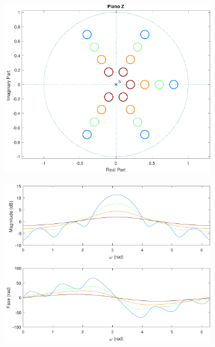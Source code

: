 \documentclass[a4paper,11pt]{article}
\numberwithin{figure}{section}
\numberwithin{equation}{section}
\numberwithin{table}{section}
\theoremstyle{definition}
\begin{document}
\begin{figure}[ht]
\begin{subfigure}{0.44\textwidth}
		\includegraphics[width=\textwidth]{ex_3_pz_6}
	\end{subfigure}
	\begin{subfigure}{0.44\textwidth}
		\includegraphics[width=\textwidth]{ex_3_bode_6}
	\end{subfigure}\\
	\begin{subfigure}{0.44\textwidth}

\end{subfigure}
\end{figure}
\end{document}

